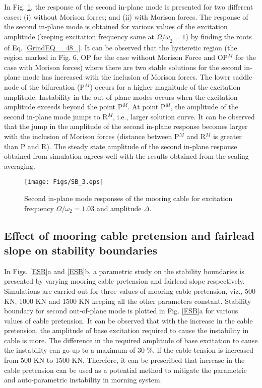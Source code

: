 \documentclass[review]{elsarticle}
\begin{document}
In Fig. \ref{SB_z}, the response of the second in-plane mode is presented for two different cases: (i) without Morison forces; and (ii) with Morison forces. The response of the second in-plane mode is obtained for various values of the excitation amplitude (keeping excitation frequency same at ${\mathit{\Omega}/\omega }_2=1$) by finding the roots of Eq. \eqref{GrindEQ__48_}. It can be observed that the hysteretic region (the region marked in Fig. 6, OP for the case without Morison Force and OP${}^{M}$ for the case with Morison forces) where there are two stable solutions for the second in-plane mode has increased with the inclusion of Morison forces. The lower saddle node of the bifurcation (P${}^{M}$) occurs for a higher magnitude of the excitation amplitude. Instability in the out-of-plane modes occurs when the excitation amplitude exceeds beyond the point P${}^{M}$. At point P${}^{M}$, the amplitude of the second in-plane mode jumps to R${}^{M}$, i.e., larger solution curve. It can be observed that the jump in the amplitude of the second in-plane response becomes larger with the inclusion of Morison forces (distance between P${}^{M}$ and R${}^{M}$ is greater than P and R). The steady state amplitude of the second in-plane response obtained from simulation agrees well with the results obtained from the scaling-averaging.
\begin{figure}
	\centering
	\texttt{[image: Figs/SB\_3.eps]}
	\caption{Second in-plane mode responses of the mooring cable for excitation frequency $\Omega/\omega_2=1.03$ and amplitude $\Delta$.}
	\label{SB_z}
\end{figure}
\subsection{Effect of mooring cable pretension and fairlead slope on stability boundaries}
In Figs. \ref{ESB}a and \ref{ESB}b, a parametric study on the stability boundaries is presented by varying mooring cable pretension and fairlead slope respectively. Simulations are carried out for three values of mooring cable pretension, viz., 500 KN, 1000 KN and 1500 KN keeping all the other parameters constant. Stability boundary for second out-of-plane mode is plotted in Fig. \ref{ESB}a for various values of cable pretension. It can be observed that with the increase in the cable pretension, the amplitude of base excitation required to cause the instability in cable is more. The difference in the required amplitude of base excitation to cause the instability can go up to a maximum of 30 $\%$, if the cable tension is increased from 500 KN to 1500 KN. Therefore, it can be prescribed that increase in the cable pretension can be used as a potential method to mitigate the parametric and auto-parametric instability in morning system.
\end{document}
